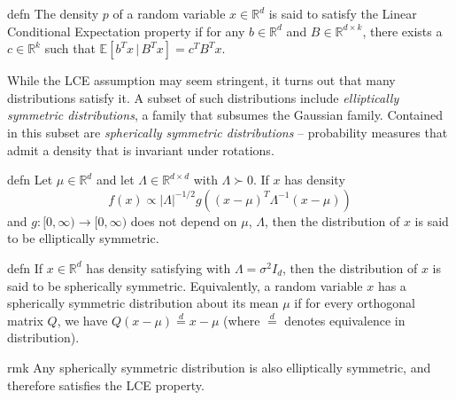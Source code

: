 \documentclass[11pt]{article}
\begin{document}
\begin{restatable}{defn}{} \label{def: lce}
    The density $p$ of a random variable $x\in \mathbb{R}^d$ is said to satisfy the Linear Conditional Expectation property if for any $b \in \mathbb{R}^{d}$ and $B \in \mathbb{R}^{d\times k}$, there exists a $c\in \mathbb{R}^k$ such that $\mathbb{E}[b^Tx \,| \,B^Tx ] = c^TB^Tx.$
\end{restatable}

While the LCE assumption may seem stringent, it turns out that many distributions satisfy it. A subset of such distributions include \textit{elliptically symmetric distributions}, a family that subsumes the Gaussian family. Contained in this subset are \textit{spherically symmetric distributions} -- probability measures that admit a density that is invariant under rotations.

\begin{restatable}{defn}{}\label{def: elliptical symmetry}
Let $\mu \in \mathbb{R}^d$ and let $\Lambda \in \mathbb{R}^{d\times d}$ with $\Lambda \succ 0$. If $x$ has density
\begin{equation}
     f(x) \propto |\Lambda|^{-1/2}g\left((x-\mu)^{T}\Lambda^{-1}(x - \mu)\right)
\end{equation}
and $g:[0, \infty) \rightarrow[0, \infty)$ does not depend on $\mu$, $\Lambda$, then the distribution of $x$ is said to be elliptically symmetric. 
\end{restatable}

\begin{restatable}{defn}{}\label{def: spherical symmetry}
If $x\in \mathbb{R}^d$ has density satisfying  with $\Lambda = \sigma^2I_d$, then the distribution of $x$ is said to be spherically symmetric. Equivalently, a random variable $x$ has a spherically symmetric distribution about its mean $\mu$ if for every orthogonal matrix $Q$, we have $Q(x - \mu) \overset{d}{=} x - \mu$ (where $\overset{d}{=}$ denotes equivalence in distribution). 
\end{restatable}


\begin{restatable}{rmk}{}
    Any spherically symmetric distribution is also elliptically symmetric, and therefore satisfies the LCE property. 
\end{restatable}
\end{document}
